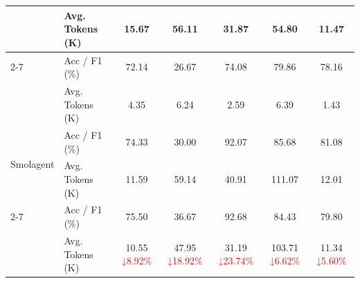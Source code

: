 \begin{table}[!t]
{\begin{tabular}{@{}llccccc@{}}
                                                       & Avg. Tokens (K)  & 15.67                                        & 56.11                                         & 31.87                                         & 54.80                                         & 11.47                                        \\ \cmidrule(l){2-7}
            \multirow{2}{*}{MetaAgent}                 & Acc / F1 (\%)    & 72.14                                        & 26.67                                         & 74.08                                         & 79.86                                         & 78.16                                        \\
                                                       & Avg. Tokens (K)  & 4.35                                         & 6.24                                          & 2.59                                          & 6.39                                          & 1.43                                         \\ \midrule
            \multirow{2}{*}{Smolagent}                 & Acc / F1 (\%)    & 74.33                                        & 30.00                                         & 92.07                                         & 85.68                                         & 81.08                                        \\
                                                       & Avg. Tokens (K)  & 11.59                                        & 59.14                                         & 40.91                                         & 111.07                                        & 12.01                                        \\ \cmidrule(l){2-7}
            \multirow{2}{*}{\, + \textbf{SMAS (ours)}} & Acc / F1 (\%)    & 75.50                                        & 36.67                                         & 92.68                                         & 84.43                                         & 79.80                                        \\
                                                       & Avg. Tokens (K)  & 10.55 {\scriptsize \textcolor{red}{↓8.92\%}} & 47.95 {\scriptsize \textcolor{red}{↓18.92\%}} & 31.19 {\scriptsize \textcolor{red}{↓23.74\%}} & 103.71 {\scriptsize \textcolor{red}{↓6.62\%}} & 11.34 {\scriptsize \textcolor{red}{↓5.60\%}} \\ \bottomrule
        \end{tabular}%
    }
\end{table}




